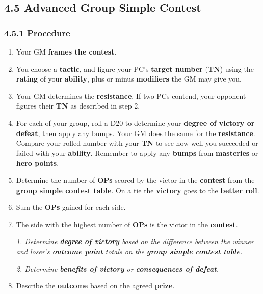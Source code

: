 \documentclass[
]{article}
\begin{document}
\hypertarget{advanced-group-simple-contest}{%
\subsection{4.5 Advanced Group Simple
Contest}\label{advanced-group-simple-contest}}

\hypertarget{procedure-2}{%
\subsubsection{4.5.1 Procedure}\label{procedure-2}}

\begin{enumerate}
\def\labelenumi{\arabic{enumi}.}
\item
  Your GM \textbf{frames the contest}.
\item
  You choose a \textbf{tactic}, and figure your PC's \textbf{target
  number} (\textbf{TN}) using the \textbf{rating} of your
  \textbf{ability}, plus or minus \textbf{modifiers} the GM may give
  you.
\item
  Your GM determines the \textbf{resistance}. If two PCs contend, your
  opponent figures their \textbf{TN} as described in step 2.
\item
  For each of your group, roll a D20 to determine your \textbf{degree of
  victory or defeat}, then apply any bumps. Your GM does the same for
  the \textbf{resistance}. Compare your rolled number with your
  \textbf{TN} to see how well you succeeded or failed with your
  \textbf{ability}. Remember to apply any \textbf{bumps} from
  \textbf{masteries} or \textbf{hero points}.
\item
  Determine the number of \textbf{OPs} scored by the victor in the
  \textbf{contest} from the \textbf{group simple contest table}. On a
  tie the \textbf{victory} goes to the \textbf{better roll}.
\item
  Sum the \textbf{OPs} gained for each side.
\item
  The side with the highest number of \textbf{OPs} is the victor in the
  \textbf{contest}.

  \emph{1. Determine \textbf{degree of victory} based on the difference
  between the winner and loser's \textbf{outcome point} totals on the
  \textbf{group simple contest table}.}

  \emph{2. Determine \textbf{benefits of victory} or
  \textbf{consequences of defeat}.}
\item
  Describe the \textbf{outcome} based on the agreed \textbf{prize}.
\end{enumerate}
\end{document}
